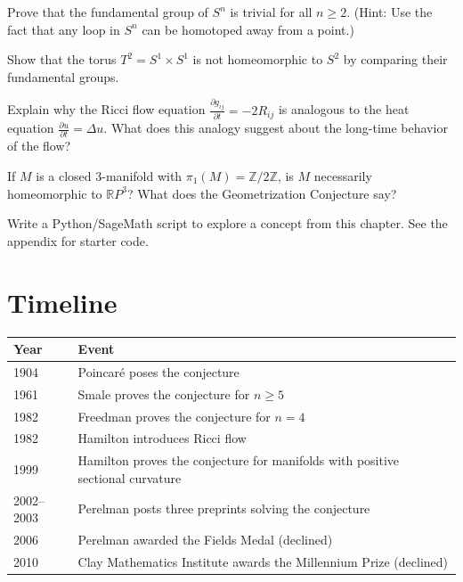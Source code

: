 \begin{exercise}[Basic]
Prove that the fundamental group of $S^n$ is trivial for all $n \geq 2$. (Hint: Use the fact that any loop in $S^n$ can be homotoped away from a point.)
\end{exercise}

\begin{exercise}[Intermediate]
Show that the torus $T^2 = S^1 \times S^1$ is not homeomorphic to $S^2$ by comparing their fundamental groups.
\end{exercise}

\begin{exercise}[Challenge]
Explain why the Ricci flow equation $\frac{\partial g_{ij}}{\partial t} = -2R_{ij}$ is analogous to the heat equation $\frac{\partial u}{\partial t} = \Delta u$. What does this analogy suggest about the long-time behavior of the flow?
\end{exercise}

\begin{exercise}
If $M$ is a closed 3-manifold with $\pi_1(M) = \mathbb{Z}/2\mathbb{Z}$, is $M$ necessarily homeomorphic to $\mathbb{R}P^3$? What does the Geometrization Conjecture say?
\end{exercise}


\begin{exercise}[Computational]
Write a Python/SageMath script to explore a concept from this chapter. See the appendix for starter code.
\end{exercise}

\section{Timeline}

\begin{tabularx}{\linewidth}{lX}
\toprule
\textbf{Year} & \textbf{Event} \\ \midrule
1904 & Poincar\'e poses the conjecture \\ 
1961 & Smale proves the conjecture for $n \geq 5$ \cite{smale1961} \\ 
1982 & Freedman proves the conjecture for $n = 4$ \cite{freedman1982} \\ 
1982 & Hamilton introduces Ricci flow \cite{hamilton1982} \\ 
1999 & Hamilton proves the conjecture for manifolds with positive sectional curvature \\ 
2002--2003 & Perelman posts three preprints solving the conjecture \cite{perelman2002,perelman2003a,perelman2003b} \\ 
2006 & Perelman awarded the Fields Medal (declined) \\ 
2010 & Clay Mathematics Institute awards the Millennium Prize (declined) \\ \bottomrule
\end{tabularx}


